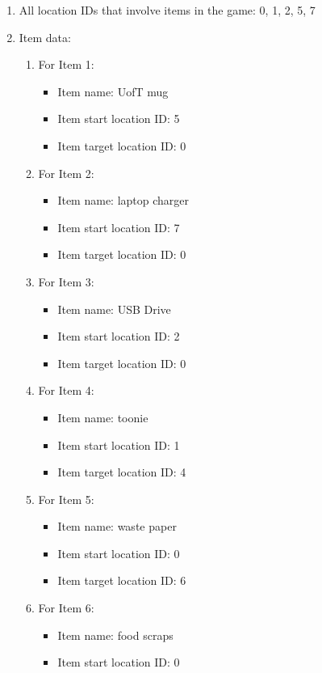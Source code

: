 \documentclass[11pt]{article}
\begin{document}
\begin{enumerate}
\item All location IDs that involve items in the game: 0, 1, 2, 5, 7

\item Item data:
\begin{enumerate}
    \item For Item 1:
    \begin{itemize}
    \item Item name: UofT mug
    \item Item start location ID: 5
    \item Item target location ID: 0
    \end{itemize}
        \item For Item 2:
    \begin{itemize}
    \item Item name: laptop charger
    \item Item start location ID: 7
    \item Item target location ID: 0
    \end{itemize}
        \item For Item 3:
    \begin{itemize}
    \item Item name: USB Drive
    \item Item start location ID: 2
    \item Item target location ID: 0
    \end{itemize}
        \item For Item 4:
    \begin{itemize}
    \item Item name: toonie
    \item Item start location ID: 1
    \item Item target location ID: 4
    \end{itemize}
        \item For Item 5:
    \begin{itemize}
    \item Item name: waste paper
    \item Item start location ID: 0
    \item Item target location ID: 6
    \end{itemize}
        \item For Item 6:
    \begin{itemize}
    \item Item name: food scraps
    \item Item start location ID: 0

\end{itemize}
\end{enumerate}
\end{enumerate}
\end{document}
